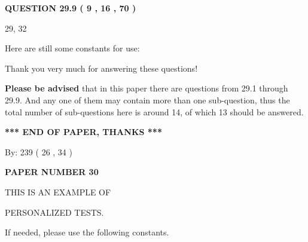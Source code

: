 \documentclass[12pt]{article}
\begin{document}
 
 
 
  
\vspace{0.2in}
  
{\textbf{\Large{QUESTION
29.9 
 (           9 ,          16 ,          70 )
}}}
  
  


 
 
\noindent{}

29,  %
32
 
 
 
   
   
 \vspace{0.2in}
Here are still some constants for use:
 
 
 
 
Thank you very much for answering these questions!
 
{\textbf{\large{Please be advised}}} that in this paper there are questions from
29.1 through
29.9.
And any one of them may contain more than one sub-question, thus the total number
of sub-questions here is around 14, of which
13 should be answered.
 
   
   
   
   
\vspace{1.0in} 
{\textbf{\large{ *** END OF PAPER, THANKS *** }}} 
   
   
\hspace{1.0in} By: 
         239 (          26 ,           34 )
   
   
   
   
\newpage 
\setcounter{page}{ 
    30001 } 
   
   
   
   
 {\textbf{ \Large{ PAPER NUMBER           30  }}}
   
   
\vspace{0.2in}
   
   
   
   
   
   
 \vspace{0.2in}
 
 
{\Huge  THIS IS AN EXAMPLE OF}
 
{\Huge  PERSONALIZED TESTS. }
 
If needed, please use the following constants.
 
\end{document}
